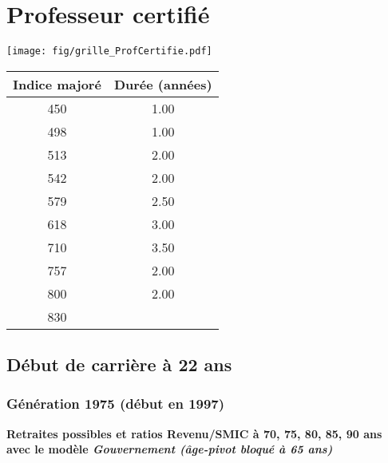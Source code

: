 \newpage 
 
\chapter{Professeur certifié} 

\begin{minipage}{0.55\linewidth}\texttt{[image: fig/grille\_ProfCertifie.pdf]}\end{minipage} 
\begin{minipage}{0.3\linewidth} 
 \begin{center} 

\begin{tabular}[htb]{|c|c|} 
\hline 
 Indice majoré &  Durée (années) \\ 
\hline \hline 
 450 &  1.00 \\ 
\hline 
 498 &  1.00 \\ 
\hline 
 513 &  2.00 \\ 
\hline 
 542 &  2.00 \\ 
\hline 
 579 &  2.50 \\ 
\hline 
 618 &  3.00 \\ 
\hline 
 710 &  3.50 \\ 
\hline 
 757 &  2.00 \\ 
\hline 
 800 &  2.00 \\ 
\hline 
 830 &   \\ 
\hline 
\hline 
\end{tabular} 
\end{center} 
 \end{minipage} 


 \addto{\captionsenglish}{ \renewcommand{\mtctitle}{}} \setcounter{minitocdepth}{2} 
 \minitoc \newpage 

\section{Début de carrière à 22 ans} 

\subsection{Génération 1975 (début en 1997)} 

{\bf \noindent Retraites possibles et ratios Revenu/SMIC à 70, 75, 80, 85, 90 ans avec le modèle \emph{Gouvernement (âge-pivot bloqué à 65 ans)}}  
 
